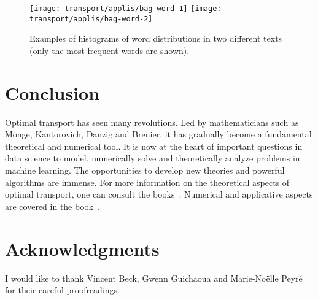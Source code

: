 \begin{figure}\centering
    \texttt{[image: transport/applis/bag-word-1]}
    \qquad
    \texttt{[image: transport/applis/bag-word-2]}
\caption{\label{fig:bagwords} Examples of histograms of word distributions in two different texts (only the most frequent words are shown). }
\end{figure}


\section*{Conclusion}

Optimal transport has seen many revolutions. Led by mathematicians such as Monge, Kantorovich, Danzig and Brenier, it has gradually become a fundamental theoretical and numerical tool.
%
It is now at the heart of important questions in data science to model, numerically solve and theoretically analyze problems in machine learning. The opportunities to develop new theories and powerful algorithms are immense.
%
For more information on the theoretical aspects of optimal transport, one can consult the books~\cite{Villani03, SantambrogioBook}. Numerical and applicative aspects are covered in the book~\cite{PeyreCuturi}.

\section *{Acknowledgments}

I would like to thank Vincent Beck, Gwenn Guichaoua and Marie-Noëlle Peyr\'e for their careful proofreadings.